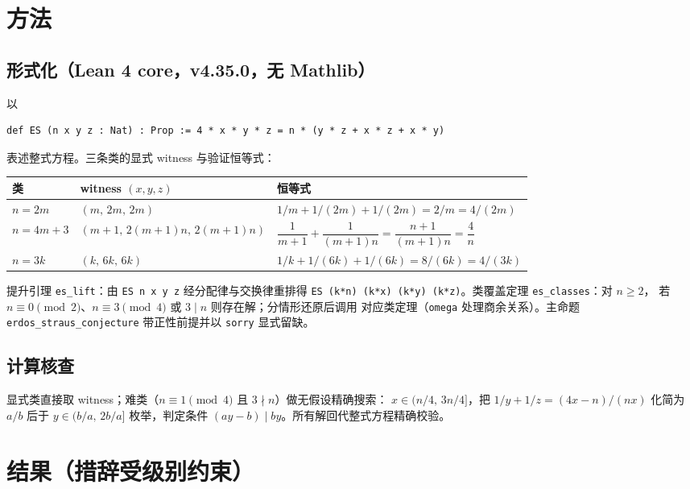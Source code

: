 \documentclass[11pt]{article}
\begin{document}
\section{方法}

\subsection{形式化（Lean 4 core，v4.35.0，无 Mathlib）}

以
\begin{verbatim}
def ES (n x y z : Nat) : Prop := 4 * x * y * z = n * (y * z + x * z + x * y)
\end{verbatim}
表述整式方程。三条类的显式 witness 与验证恒等式：

\begin{center}
\begin{tabular}{lll}
\hline
类 & witness $(x,y,z)$ & 恒等式 \\
\hline
$n = 2m$ & $(m,\,2m,\,2m)$ & $1/m + 1/(2m) + 1/(2m) = 2/m = 4/(2m)$ \\
$n = 4m+3$ & $(m{+}1,\,2(m{+}1)n,\,2(m{+}1)n)$ &
  $\dfrac{1}{m{+}1} + \dfrac{1}{(m{+}1)n} = \dfrac{n+1}{(m{+}1)n} = \dfrac{4}{n}$ \\
$n = 3k$ & $(k,\,6k,\,6k)$ & $1/k + 1/(6k) + 1/(6k) = 8/(6k) = 4/(3k)$ \\
\hline
\end{tabular}
\end{center}

提升引理 \texttt{es\_lift}：由 \texttt{ES n x y z} 经分配律与交换律重排得
\texttt{ES (k*n) (k*x) (k*y) (k*z)}。类覆盖定理 \texttt{es\_classes}：对 $n \ge 2$，
若 $n \equiv 0 \pmod 2$、$n \equiv 3 \pmod 4$ 或 $3 \mid n$ 则存在解；分情形还原后调用
对应类定理（\texttt{omega} 处理商余关系）。主命题 \texttt{erdos\_straus\_conjecture}
带正性前提并以 \texttt{sorry} 显式留缺。

\subsection{计算核查}

显式类直接取 witness；难类（$n \equiv 1 \pmod 4$ 且 $3 \nmid n$）做无假设精确搜索：
$x \in (n/4,\, 3n/4]$，把 $1/y + 1/z = (4x-n)/(nx)$ 化简为 $a/b$ 后于
$y \in (b/a,\, 2b/a]$ 枚举，判定条件 $(ay - b) \mid by$。所有解回代整式方程精确校验。

\section{结果（措辞受级别约束）}
\end{document}
